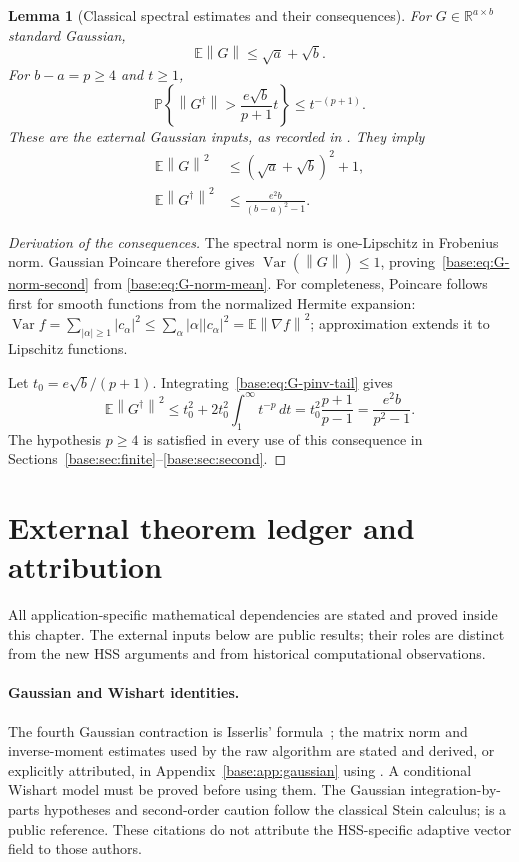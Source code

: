 \documentclass[11pt,oneside,openany,a4paper]{book}
\numberwithin{equation}{chapter}
\newtheorem{lemma}[theorem]{Lemma}
\theoremstyle{definition}
\theoremstyle{remark}
\newcommand{\R}{\mathbb R}\newcommand{\E}{\mathbb E}\newcommand{\Prb}{\mathbb P}\newcommand{\PP}{\mathbb P}
\newcommand{\N}[1]{\left\lVert#1\right\rVert}
\DeclareMathOperator{\Var}{Var}\DeclareMathOperator{\supp}{supp}
\begin{document}
\begin{lemma}[Classical spectral estimates and their consequences]
\label{base:lem:gaussian-spectral}
For $G\in\R^{a\times b}$ standard Gaussian,
\begin{equation}\label{base:eq:G-norm-mean}
 \E\N G\le\sqrt a+\sqrt b.
\end{equation}
For $b-a=p\ge4$ and $t\ge1$,
\begin{equation}\label{base:eq:G-pinv-tail}
 \Prb\left\{\N{G^\dagger}>\frac{e\sqrt b}{p+1}t\right\}
 \le t^{-(p+1)}.
\end{equation}
These are the external Gaussian inputs, as recorded in
\cite[Propositions 10.1 and 10.4]{HMT}. They imply
\begin{align}
 \E\N G^2&\le(\sqrt a+\sqrt b)^2+1,\label{base:eq:G-norm-second}\\
 \E\N{G^\dagger}^2&\le\frac{e^2b}{(b-a)^2-1}.
                                                     \label{base:eq:G-pinv-second}
\end{align}
\end{lemma}
\begin{proof}[Derivation of the consequences]
The spectral norm is one-Lipschitz in Frobenius norm. Gaussian Poincare
therefore gives $\Var(\N G)\le1$, proving~\eqref{base:eq:G-norm-second} from
\eqref{base:eq:G-norm-mean}. For completeness, Poincare follows first for smooth
functions from the normalized Hermite expansion:
$\Var f=\sum_{|\alpha|\ge1}|c_\alpha|^2
\le\sum_\alpha |\alpha||c_\alpha|^2
=\E\N{\nabla f}^2$; approximation extends it to Lipschitz functions.

Let $t_0=e\sqrt b/(p+1)$. Integrating~\eqref{base:eq:G-pinv-tail} gives
\[
 \E\N{G^\dagger}^2
 \le t_0^2+2t_0^2\int_1^\infty t^{-p}\,dt
 =t_0^2\frac{p+1}{p-1}
 =\frac{e^2b}{p^2-1}.
\]
The hypothesis $p\ge4$ is satisfied in every use of this consequence in
Sections~\ref{base:sec:finite}--\ref{base:sec:second}.
\end{proof}

\section{External theorem ledger and attribution}\label{base:new:external}
All application-specific mathematical dependencies are stated and proved inside this chapter. The external inputs below are public results; their roles are distinct from the new HSS arguments and from historical computational observations.

\paragraph{Gaussian and Wishart identities.}
The fourth Gaussian contraction is Isserlis' formula~\cite{Isserlis}; the matrix norm and inverse-moment estimates used by the raw algorithm are stated and derived, or explicitly attributed, in Appendix~\ref{base:app:gaussian} using \cite{HMT}. A conditional Wishart model must be proved before using them. The Gaussian integration-by-parts hypotheses and second-order caution follow the classical Stein calculus; \cite{BellecZhang} is a public reference. These citations do not attribute the HSS-specific adaptive vector field to those authors.
\end{document}
